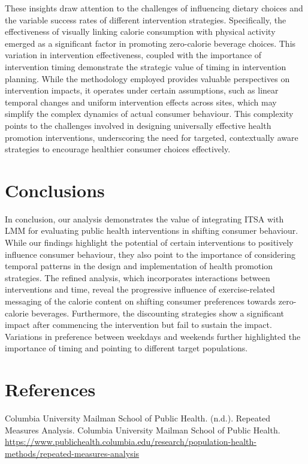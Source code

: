 \documentclass[
]{article}
\begin{document}
These insights draw attention to the challenges of influencing dietary choices and the variable success rates of different intervention strategies. Specifically, the effectiveness of visually linking calorie consumption with physical activity emerged as a significant factor in promoting zero-calorie beverage choices. This variation in intervention effectiveness, coupled with the importance of intervention timing demonstrate the strategic value of timing in intervention planning. While the methodology employed provides valuable perspectives on intervention impacts, it operates under certain assumptions, such as linear temporal changes and uniform intervention effects across sites, which may simplify the complex dynamics of actual consumer behaviour. This complexity points to the challenges involved in designing universally effective health promotion interventions, underscoring the need for targeted, contextually aware strategies to encourage healthier consumer choices effectively.

\hypertarget{conclusions}{%
\section{Conclusions}\label{conclusions}}

In conclusion, our analysis demonstrates the value of integrating ITSA with LMM for evaluating public health interventions in shifting consumer behaviour. While our findings highlight the potential of certain interventions to positively influence consumer behaviour, they also point to the importance of considering temporal patterns in the design and implementation of health promotion strategies. The refined analysis, which incorporates interactions between interventions and time, reveal the progressive influence of exercise-related messaging of the calorie content on shifting consumer preferences towards zero-calorie beverages. Furthermore, the discounting strategies show a significant impact after commencing the intervention but fail to sustain the impact. Variations in preference between weekdays and weekends further highlighted the importance of timing and pointing to different target populations.

\hypertarget{references}{%
\section{References}\label{references}}

Columbia University Mailman School of Public Health. (n.d.). Repeated Measures Analysis. Columbia University Mailman School of Public Health. \url{https://www.publichealth.columbia.edu/research/population-health-methods/repeated-measures-analysis}
\end{document}
